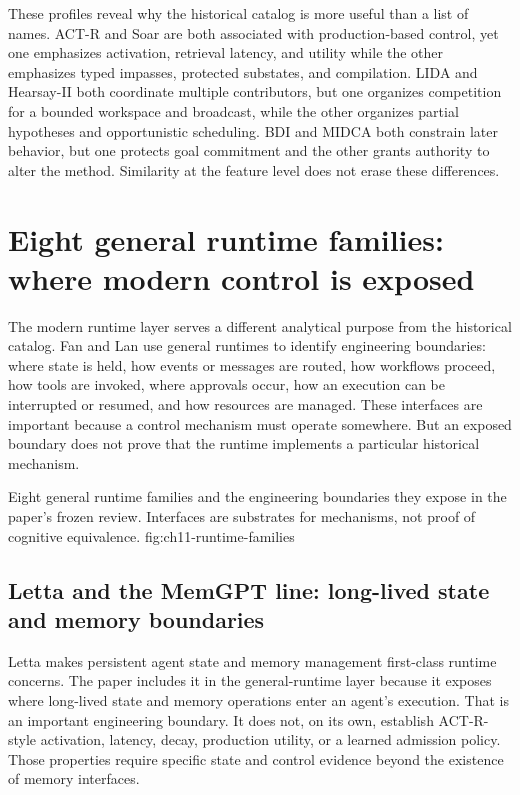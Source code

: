 These profiles reveal why the historical catalog is more useful than a list of names. ACT-R and Soar are both associated with production-based control, yet one emphasizes activation, retrieval latency, and utility while the other emphasizes typed impasses, protected substates, and compilation. LIDA and Hearsay-II both coordinate multiple contributors, but one organizes competition for a bounded workspace and broadcast, while the other organizes partial hypotheses and opportunistic scheduling. BDI and MIDCA both constrain later behavior, but one protects goal commitment and the other grants authority to alter the method. Similarity at the feature level does not erase these differences.

\section{Eight general runtime families: where modern control is exposed}
\label{sec:ch11-general-runtimes}

The modern runtime layer serves a different analytical purpose from the historical catalog. Fan and Lan use general runtimes to identify engineering boundaries: where state is held, how events or messages are routed, how workflows proceed, how tools are invoked, where approvals occur, how an execution can be interrupted or resumed, and how resources are managed. These interfaces are important because a control mechanism must operate somewhere. But an exposed boundary does not prove that the runtime implements a particular historical mechanism.

  {Eight general runtime families and the engineering boundaries they expose in the paper's frozen review. Interfaces are substrates for mechanisms, not proof of cognitive equivalence.}
  {fig:ch11-runtime-families}

\subsection{Letta and the MemGPT line: long-lived state and memory boundaries}

Letta makes persistent agent state and memory management first-class runtime concerns. The paper includes it in the general-runtime layer because it exposes where long-lived state and memory operations enter an agent's execution. That is an important engineering boundary. It does not, on its own, establish ACT-R-style activation, latency, decay, production utility, or a learned admission policy. Those properties require specific state and control evidence beyond the existence of memory interfaces.

